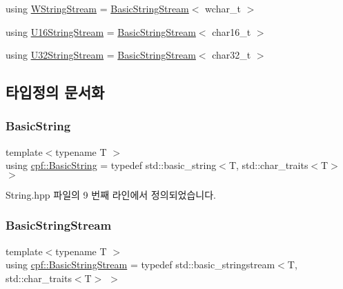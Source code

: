 \begin{DoxyCompactItemize}
\item 
using \hyperlink{namespacecpf_a7e79dec7a6790331bee7ef1e85dafba6}{W\+String\+Stream} = \hyperlink{namespacecpf_a1fe334b3d2422535a1cfe51785d98cb8}{Basic\+String\+Stream}$<$ wchar\+\_\+t $>$
\item 
using \hyperlink{namespacecpf_a401e80bf9227c14c3f1f27121ba489d1}{U16\+String\+Stream} = \hyperlink{namespacecpf_a1fe334b3d2422535a1cfe51785d98cb8}{Basic\+String\+Stream}$<$ char16\+\_\+t $>$
\item 
using \hyperlink{namespacecpf_a7e95b195d831b69d8e661dd685128097}{U32\+String\+Stream} = \hyperlink{namespacecpf_a1fe334b3d2422535a1cfe51785d98cb8}{Basic\+String\+Stream}$<$ char32\+\_\+t $>$
\end{DoxyCompactItemize}


\subsection{타입정의 문서화}
\mbox{\label{namespacecpf_ac91c8c57a370a5bef21ac23f876ad536}} 
\subsubsection{\texorpdfstring{Basic\+String}{BasicString}}
{\footnotesize\ttfamily template$<$typename T $>$ \\
using \hyperlink{namespacecpf_ac91c8c57a370a5bef21ac23f876ad536}{cpf\+::\+Basic\+String} = typedef std\+::basic\+\_\+string$<$T, std\+::char\+\_\+traits$<$T$>$ $>$}



String.\+hpp 파일의 9 번째 라인에서 정의되었습니다.

\mbox{\label{namespacecpf_a1fe334b3d2422535a1cfe51785d98cb8}} 
\subsubsection{\texorpdfstring{Basic\+String\+Stream}{BasicStringStream}}
{\footnotesize\ttfamily template$<$typename T $>$ \\
using \hyperlink{namespacecpf_a1fe334b3d2422535a1cfe51785d98cb8}{cpf\+::\+Basic\+String\+Stream} = typedef std\+::basic\+\_\+stringstream$<$T, std\+::char\+\_\+traits$<$T$>$ $>$}



